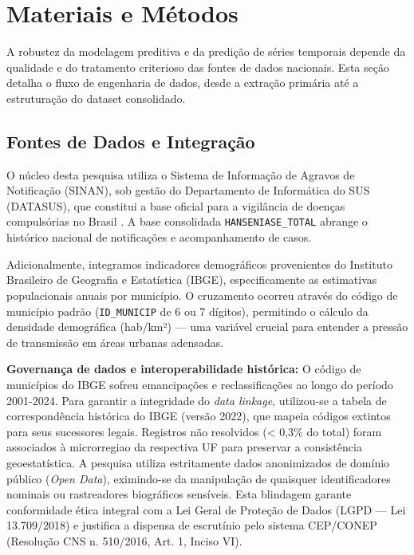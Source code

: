 \chapter{Materiais e Métodos}


A robustez da modelagem preditiva e da predição de séries temporais depende da qualidade e do tratamento criterioso das fontes de dados nacionais. Esta seção detalha o fluxo de engenharia de dados, desde a extração primária até a estruturação do dataset consolidado.

\section{Fontes de Dados e Integração}

O núcleo desta pesquisa utiliza o Sistema de Informação de Agravos de Notificação (SINAN), sob gestão do Departamento de Informática do SUS (DATASUS), que constitui a base oficial para a vigilância de doenças compulsórias no Brasil \cite{sinan_pinto}. A base consolidada \texttt{HANSENIASE\_TOTAL} abrange o histórico nacional de notificações e acompanhamento de casos.

Adicionalmente, integramos indicadores demográficos provenientes do Instituto Brasileiro de Geografia e Estatística (IBGE), especificamente as estimativas populacionais anuais por município. O cruzamento ocorreu através do código de município padrão (\texttt{ID\_MUNICIP} de 6 ou 7 dígitos), permitindo o cálculo da densidade demográfica (hab/km²) — uma variável crucial para entender a pressão de transmissão em áreas urbanas adensadas.

\textbf{Governança de dados e interoperabilidade histórica:} O código de municípios do IBGE sofreu emancipações e reclassificações ao longo do período 2001-2024. Para garantir a integridade do \textit{data linkage}, utilizou-se a tabela de correspondência histórica do IBGE (versão 2022), que mapeia códigos extintos para seus sucessores legais. Registros não resolvidos (< 0,3\% do total) foram associados à microrregiao da respectiva UF para preservar a consistência geoestatística. A pesquisa utiliza estritamente dados anonimizados de domínio público (\textit{Open Data}), eximindo-se da manipulação de quaisquer identificadores nominais ou rastreadores biográficos sensíveis. Esta blindagem garante conformidade ética integral com a Lei Geral de Proteção de Dados (LGPD — Lei 13.709/2018) e justifica a dispensa de escrutínio pelo sistema CEP/CONEP (Resolução CNS n.\textdegree{} 510/2016, Art. 1\textdegree{}, Inciso VI).

